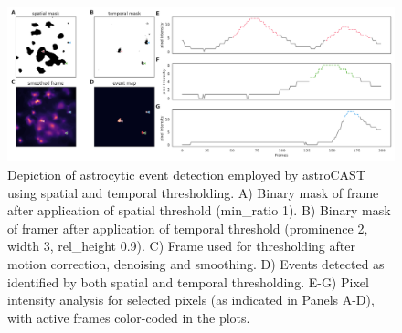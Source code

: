 \begin{figure}[!htb]
\begin{center}
\includegraphics[width=\linewidth]{figures/5.png}
\end{center}
\caption{
Depiction of astrocytic event detection employed by astroCAST using spatial and temporal thresholding. A) Binary mask of frame after application of spatial threshold (min\_ratio 1). B) Binary mask of framer after application of temporal threshold (prominence 2, width 3, rel\_height 0.9). C) Frame used for thresholding after motion correction, denoising and smoothing. D) Events detected as identified by both spatial and temporal thresholding. E-G) Pixel intensity analysis for selected pixels (as indicated in Panels A-D), with active frames color-coded in the plots.
}\label{fig:5}
\end{figure}

